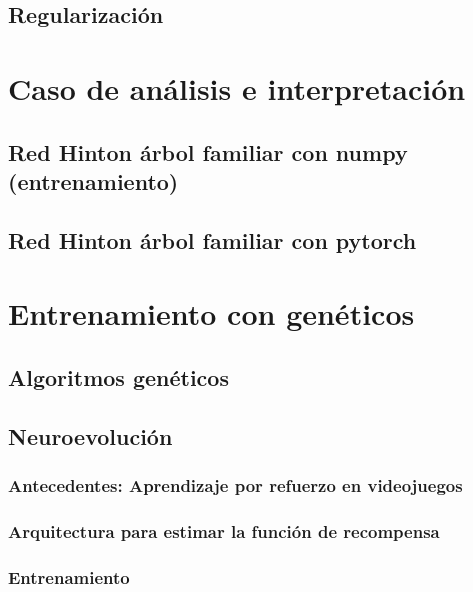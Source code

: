 \documentclass[12pt,openany]{book}
\begin{document}
\section{Regularización}

\chapter{Caso de análisis e interpretación}

\section{Red Hinton árbol familiar con numpy (entrenamiento)}

\section{Red Hinton árbol familiar con pytorch}

\chapter{Entrenamiento con genéticos}
\section{Algoritmos genéticos}
\section{Neuroevolución}
\subsection{Antecedentes: Aprendizaje por refuerzo en videojuegos}
\subsection{Arquitectura para estimar la función de recompensa}
\subsection{Entrenamiento}

\end{document}
